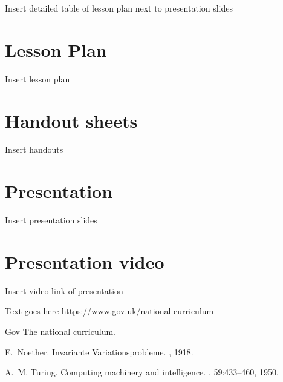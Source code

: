 \documentclass[12pt, a4paper,oneside]{book}
\numberwithin{equation}{section}
\begin{document}
Insert detailed table of lesson plan next to presentation slides

\section{Lesson Plan}\label{secx.x}

Insert lesson plan

\section{Handout sheets}\label{secx}

Insert handouts

\section{Presentation}\label{secx.x}

Insert presentation slides


\section{Presentation video}\label{secx.x}

Insert video link of presentation






Text goes here
https://www.gov.uk/national-curriculum



\begin{thebibliography}{999}


\bibitem{}
Gov
\newblock The national curriculum.

\bibitem{}




E.~Noether.
\newblock Invariante {V}ariationsprobleme.
, 1918.

A.~M. Turing.
\newblock Computing machinery and intelligence.
, 59:433--460, 1950.


\end{thebibliography}
\end{document}
